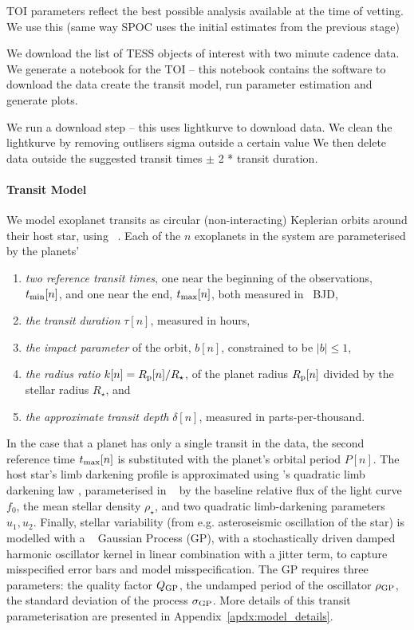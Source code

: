 \documentclass[floatfix,ApJL,twocolumn]{aastex631}
\begin{document}
TOI parameters reflect the best possible analysis available at the time of vetting.
We use this (same way SPOC uses the initial estimates from the previous stage)


We download the list of TESS objects of interest with two minute cadence data.
We generate a notebook for the TOI -- this notebook contains the software to download the data create the transit model, run parameter estimation and generate plots.

We run a download step -- this uses lightkurve to download data.
We clean the lightkurve by removing outlisers sigma outside a certain value
We then delete data outside the suggested transit times $\pm$ 2 * transit duration.


\paragraph{Transit Model}
We model exoplanet transits as circular (non-interacting) Keplerian orbits around their host star, using \exoplanet~\citep{Foreman-Mackey:2021:JOSS}. Each of the $n$ exoplanets in the system are parameterised by the planets'
\begin{enumerate}
  \item \emph{two reference transit times}, one near the beginning of the observations, $t_{\rm min}[n]$, and one near the end, $t_{\rm max}[n]$, both measured in \tess\ BJD,
  \item \emph{the transit duration} $\tau[n]$, measured in hours,
  \item \emph{the impact parameter} of the orbit, $b[n]$, constrained to be $|b| \le 1$,
  \item \emph{the radius ratio} $k[n]=R_{\rm p}[n] / R_\star$, of the planet radius $R_{\rm p}[n]$ divided by the stellar radius $R_\star$, and
  \item \emph{the approximate transit depth} $\delta[n]$, measured in parts-per-thousand.
\end{enumerate}
In the case that a planet has only a single transit in the data, the second reference time $t_{\rm max}[n]$ is substituted with the planet's orbital period $P[n]$.
The host star's limb darkening profile is approximated using \citet{Kipping:2013:MNRAS}'s quadratic limb darkening law \citep{Claret:2000:A&A, Mandel:2002:ApJL}, parameterised in \starry~\citep{Luger:2019:AJ} by the baseline relative flux of the light curve $f_0$,
the mean stellar density $\rho_\star$,
and two quadratic limb-darkening parameters $u_1, u_2$.
Finally, stellar variability (from e.g. asteroseismic oscillation of the star)  is modelled with a \celerite~\citep{Foreman-Mackey:2017:ascl} Gaussian Process (GP), with a stochastically driven damped harmonic oscillator kernel in linear combination with a jitter term, to capture misspecified error bars and model misspecification.
The GP requires three parameters: the quality factor $Q_{\rm GP}$, the undamped period of the oscillator $\rho_{\rm GP}$, the standard deviation of the process $\sigma_{\rm GP}$.
More details of this transit parameterisation are presented in Appendix~\ref{apdx:model_details}.
\end{document}
